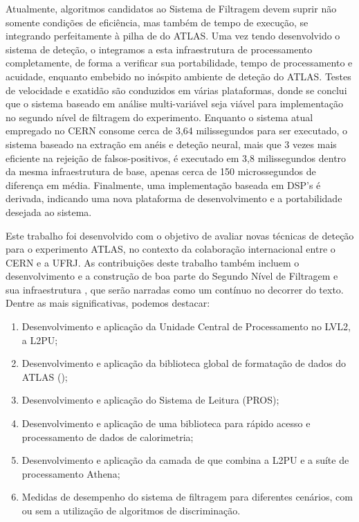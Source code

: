 Atualmente, algoritmos candidatos ao Sistema de Filtragem devem suprir não
somente condições de eficiência, mas também de tempo de execução, se
integrando perfeitamente à pilha de  do ATLAS. Uma vez tendo
desenvolvido o sistema de deteção, o integramos a esta infraestrutura de
processamento completamente, de forma a verificar sua portabilidade, tempo de
processamento e acuidade, enquanto embebido no inóspito ambiente de deteção do
ATLAS. Testes de velocidade e exatidão são conduzidos em várias plataformas,
donde se conclui que o sistema baseado em análise multi-variável seja viável
para implementação no segundo nível de filtragem do experimento. Enquanto o
sistema atual empregado no CERN consome cerca de 3,64 milissegundos para ser
executado, o sistema baseado na extração em anéis e deteção neural, mais que 3
vezes mais eficiente na rejeição de falsos-positivos, é executado em 3,8
milissegundos dentro da mesma infraestrutura de base, apenas cerca de 150
microssegundos de diferença em média. Finalmente, uma implementação baseada em
DSP's é derivada, indicando uma nova plataforma de desenvolvimento e a
portabilidade desejada ao sistema.

Este trabalho foi desenvolvido com o objetivo de avaliar novas técnicas de
deteção para o experimento ATLAS, no contexto da colaboração internacional
entre o CERN e a UFRJ. As contribuições deste trabalho também incluem o
desenvolvimento e a construção de boa parte do Segundo Nível de Filtragem e sua
infraestrutura , que serão narradas como um contínuo no decorrer do
texto. Dentre as mais significativas, podemos destacar:

\begin{enumerate}
\item Desenvolvimento e aplicação da Unidade Central de Processamento no
LVL2, a L2PU;
\item Desenvolvimento e aplicação da biblioteca global de formatação de dados
do ATLAS ();
\item Desenvolvimento e aplicação do  Sistema de Leitura (PROS);
\item Desenvolvimento e aplicação de uma biblioteca para rápido acesso e
processamento de dados de calorimetria;
\item Desenvolvimento e aplicação da camada de  que combina a
L2PU e a suíte de processamento  Athena;
\item Medidas de desempenho do sistema de filtragem para diferentes cenários,
com ou sem a utilização de algoritmos de discriminação.
\end{enumerate}

